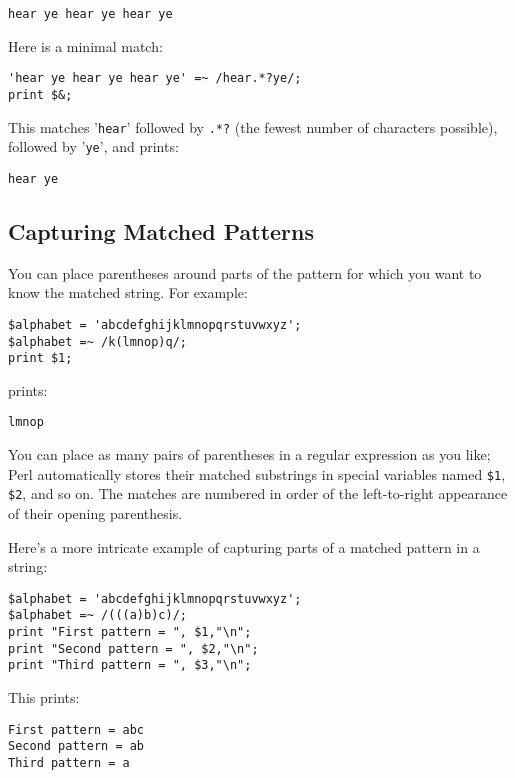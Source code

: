 \begin{lstlisting}
hear ye hear ye hear ye
\end{lstlisting}

Here is a minimal match:

\begin{lstlisting}
'hear ye hear ye hear ye' =~ /hear.*?ye/;
print $&;
\end{lstlisting}

This matches '\verb|hear|' followed by \verb|.*?| (the fewest number of characters possible), followed by '\verb|ye|', and prints:

\begin{lstlisting}
hear ye
\end{lstlisting}


\subsection{Capturing Matched Patterns}
You can place parentheses around parts of the pattern for which you want to know the matched string. For example:

\begin{lstlisting}
$alphabet = 'abcdefghijklmnopqrstuvwxyz';
$alphabet =~ /k(lmnop)q/;
print $1;
\end{lstlisting}

prints:

\begin{lstlisting}
lmnop
\end{lstlisting}

You can place as many pairs of parentheses in a regular expression as you like; Perl automatically stores their matched substrings in special variables named \verb|$1|, \verb|$2|, and so on. The matches are numbered in order of the left-to-right appearance of their opening parenthesis.  

Here's a more intricate example of capturing parts of a matched pattern in a string:

\begin{lstlisting}
$alphabet = 'abcdefghijklmnopqrstuvwxyz';
$alphabet =~ /(((a)b)c)/;
print "First pattern = ", $1,"\n";
print "Second pattern = ", $2,"\n";
print "Third pattern = ", $3,"\n";
\end{lstlisting}

This prints:

\begin{lstlisting}
First pattern = abc
Second pattern = ab
Third pattern = a
\end{lstlisting}

